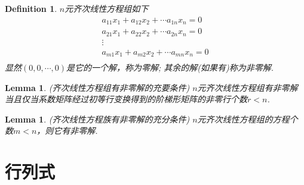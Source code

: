 \documentclass{article}
\newtheorem{lemma}[theorem]{Lemma}
\newtheorem{definition}[theorem]{Definition}
\begin{document}
\begin{definition}
\rm $n$元齐次线性方程组如下
$$
\begin{array}{l}
a_{11}x_1 + a_{12}x_2 + \cdots a_{1n}x_n = 0 \\
a_{21}x_1 + a_{22}x_2 + \cdots a_{2n}x_n = 0 \\
\vdots \\
a_{m1}x_1 + a_{m2}x_2 + \cdots a_{mn}x_n = 0 \\
\end{array}
$$
显然$(0,0,\cdots,0)$是它的一个解，称为{\color{red}零解}; 其余的解(如果有)称为{\color{red}非零解}.
\end{definition}

\begin{lemma}
\rm {\color{red} (齐次线性方程组有非零解的充要条件)} $n$元齐次线性方程组有非零解当且仅当{\color{red}系数矩阵}经过初等行变换得到的阶梯形矩阵的非零行个数$r<n$.
\end{lemma}

\begin{lemma}
\rm {\color{red} (齐次线性方程族有非零解的充分条件)} $n$元齐次线性方程组的方程个数$m < n$，则它有非零解.
\end{lemma}


\newpage
\section{行列式}
\end{document}
